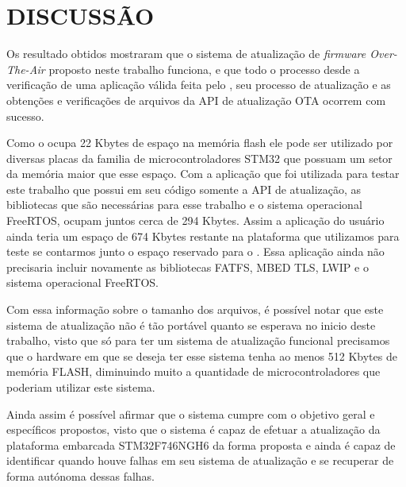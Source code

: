 \section{DISCUSSÃO}
Os resultado obtidos mostraram que o sistema de atualização de \textit{firmware Over-The-Air} proposto neste trabalho funciona, e que todo o processo desde a verificação de uma aplicação válida feita pelo \bootloader, seu processo de atualização e as obtenções e verificações de arquivos da API de atualização OTA ocorrem com sucesso.

Como o \bootloader ocupa 22 Kbytes de espaço na memória flash ele pode ser utilizado por diversas placas da familia de microcontroladores STM32 que possuam um setor da memória maior que esse espaço. Com a aplicação que foi utilizada para testar este trabalho que possui em seu código somente a API de atualização, as bibliotecas que são necessárias para esse trabalho e o sistema operacional FreeRTOS, ocupam juntos cerca de 294 Kbytes. Assim a aplicação do usuário ainda teria um espaço de 674 Kbytes restante na plataforma que utilizamos para teste se contarmos junto o espaço reservado para o \bootloader. Essa aplicação ainda não precisaria incluir novamente as bibliotecas FATFS, MBED TLS, LWIP e o sistema operacional FreeRTOS.



Com essa informação sobre o tamanho dos arquivos, é possível notar que este sistema de atualização não é tão portável quanto se esperava no inicio deste trabalho, visto que só para ter um sistema de atualização funcional precisamos que o hardware em que se deseja ter esse sistema tenha ao menos 512 Kbytes de memória FLASH, diminuindo muito a quantidade de microcontroladores que poderiam utilizar este sistema.

Ainda assim é possível afirmar que o sistema cumpre com o objetivo geral e específicos propostos, visto que o sistema é capaz de efetuar a atualização da plataforma embarcada STM32F746NGH6 da forma proposta e ainda é capaz de identificar quando houve falhas em seu sistema de atualização e se recuperar de forma autónoma dessas falhas.
